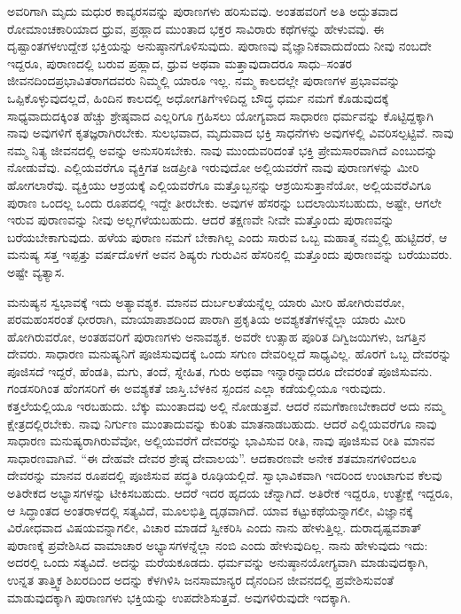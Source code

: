 ಅವರಿಗಾಗಿ ಮೃದು ಮಧುರ ಕಾವ್ಯರಸವನ್ನು ಪುರಾಣಗಳು ಹರಿಸುವವು. ಅಂತಹವರಿಗೆ ಅತಿ ಅದ್ಭುತವಾದ ರೋಮಾಂಚಕಾರಿಯಾದ ಧ್ರುವ, ಪ್ರಹ್ಲಾದ ಮುಂತಾದ ಭಕ್ತರ ಸಾವಿರಾರು ಕಥೆಗಳನ್ನು ಹೇಳುವವು. ಈ ದೃಷ್ಟಾಂತಗಳ\break ಉದ್ದೇಶ ಭಕ್ತಿಯನ್ನು ಅನುಷ್ಠಾನಗೊಳಿಸುವುದು. ಪುರಾಣವು ವೈಜ್ಞಾನಿಕ\-ವಾದುದೆಂದು ನೀವು ನಂಬದೇ ಇದ್ದರೂ, ಪುರಾಣದಲ್ಲಿ ಬರುವ ಪ್ರಹ್ಲಾದ, ಧ್ರುವ ಅಥವಾ ಮತ್ತಾವುದಾದರೂ ಸಾಧು–ಸಂತರ ಜೀವನದಿಂದ\break ಪ್ರಭಾವಿತರಾಗದವರು ನಿಮ್ಮಲ್ಲಿ ಯಾರೂ ಇಲ್ಲ. ನಮ್ಮ ಕಾಲದಲ್ಲೇ ಪುರಾಣಗಳ ಪ್ರಭಾವವನ್ನು ಒಪ್ಪಿಕೊಳ್ಳುವುದಲ್ಲದೆ, ಹಿಂದಿನ ಕಾಲದಲ್ಲಿ ಅಧೋಗತಿಗೆ\break ಇಳಿದಿದ್ದ ಬೌದ್ಧ ಧರ್ಮ ನಮಗೆ ಕೊಡುವುದಕ್ಕೆ ಸಾಧ್ಯವಾದುದಕ್ಕಿಂತ ಹೆಚ್ಚು ಶ್ರೇಷ್ಠವಾದ ಎಲ್ಲರಿಗೂ ಗ್ರಹಿಸಲು ಯೋಗ್ಯವಾದ ಸಾಧಾರಣ ಧರ್ಮವನ್ನು ಕೊಟ್ಟಿದ್ದಕ್ಕಾಗಿ ನಾವು ಅವುಗಳಿಗೆ ಕೃತಜ್ಞರಾಗಿರಬೇಕು. ಸುಲಭವಾದ, ಮೃದುವಾದ ಭಕ್ತಿ ಸಾಧನೆಗಳು ಅವುಗಳಲ್ಲಿ ವಿವರಿಸಲ್ಪಟ್ಟಿವೆ. ನಾವು ನಮ್ಮ ನಿತ್ಯ ಜೀವನದಲ್ಲಿ ಅವನ್ನು ಅನುಸರಿಸಬೇಕು. ನಾವು ಮುಂದುವರಿದಂತೆ ಭಕ್ತಿ ಪ್ರೇಮಸಾರವಾಗಿದೆ ಎಂಬುದನ್ನು ನೋಡುವೆವು. ಎಲ್ಲಿಯವರೆಗೂ ವ್ಯಕ್ತಿಗತ ಜಡಪ್ರೀತಿ ಇರುವುದೋ ಅಲ್ಲಿಯವರೆಗೆ ನಾವು ಪುರಾಣಗಳನ್ನು ಮೀರಿ ಹೋಗಲಾರೆವು. ವ್ಯಕ್ತಿಯು ಆಶ್ರಯಕ್ಕೆ ಎಲ್ಲಿಯವರೆಗೂ ಮತ್ತೊಬ್ಬನನ್ನು ಆಶ್ರಯಿಸುತ್ತಾನೆಯೋ, ಅಲ್ಲಿಯವರೆವಿಗೂ ಪುರಾಣ ಒಂದಲ್ಲ ಒಂದು ರೂಪದಲ್ಲಿ ಇದ್ದೇ ತೀರಬೇಕು. ಅವುಗಳ ಹೆಸರನ್ನು ಬದಲಾಯಿಸಬಹುದು, ಅಷ್ಟೇ, ಆಗಲೇ ಇರುವ ಪುರಾಣವನ್ನು ನೀವು ಅಲ್ಲಗಳೆಯಬಹುದು. ಆದರೆ ತಕ್ಷಣವೇ ನೀವೇ ಮತ್ತೊಂದು ಪುರಾಣವನ್ನು ಬರೆಯಬೇಕಾಗುವುದು. ಹಳೆಯ ಪುರಾಣ ನಮಗೆ ಬೇಕಾಗಿಲ್ಲ ಎಂದು ಸಾರುವ ಒಬ್ಬ ಮಹಾತ್ಮ ನಮ್ಮಲ್ಲಿ ಹುಟ್ಟಿದರೆ, ಆ ಮನುಷ್ಯ ಸತ್ತ ಇಪ್ಪತ್ತು ವರ್ಷದೊಳಗೆ ಅವನ ಶಿಷ್ಯರು ಗುರುವಿನ ಹೆಸರಿನಲ್ಲಿ ಮತ್ತೊಂದು ಪುರಾಣವನ್ನು ಬರೆಯುವರು. ಅಷ್ಟೇ ವ್ಯತ್ಯಾಸ.

ಮನುಷ್ಯನ ಸ್ವಭಾವಕ್ಕೆ ಇದು ಅತ್ಯಾವಶ್ಯಕ. ಮಾನವ ದುರ್ಬಲತೆಯನ್ನೆಲ್ಲ ಯಾರು ಮೀರಿ ಹೋಗಿರುವರೋ, ಪರಮಹಂಸರಂತೆ ಧೀರರಾಗಿ, ಮಾಯಾಪಾಶದಿಂದ ಪಾರಾಗಿ ಪ್ರಕೃತಿಯ ಅವಶ್ಯಕತೆಗಳನ್ನೆಲ್ಲಾ ಯಾರು ಮೀರಿ ಹೋಗಿರುವರೋ, ಅಂತಹವರಿಗೆ ಪುರಾಣಗಳು ಅನಾವಶ್ಯಕ. ಅವರೇ ಉತ್ಸಾಹ ಪೂರಿತ ದಿಗ್ವಿಜಯಿಗಳು, ಜಗತ್ತಿನ ದೇವರು. ಸಾಧಾರಣ ಮನುಷ್ಯನಿಗೆ ಪೂಜಿಸುವುದಕ್ಕೆ ಒಂದು ಸಗುಣ ದೇವರಿಲ್ಲದೆ ಸಾಧ್ಯವಿಲ್ಲ. ಹೊರಗೆ ಒಬ್ಬ ದೇವರನ್ನು ಪೂಜಿಸದೆ ಇದ್ದರೆ, ಹೆಂಡತಿ, ಮಗು, ತಂದೆ, ಸ್ನೇಹಿತ, ಗುರು ಅಥವಾ ಇನ್ನಾರನ್ನಾದರೂ ದೇವರಂತೆ ಪೂಜಿಸುವನು. ಗಂಡಸರಿಗಿಂತ ಹೆಂಗಸರಿಗೆ ಈ ಅವಶ್ಯಕತೆ ಜಾಸ್ತಿ.\break ಬೆಳಕಿನ ಸ್ಪಂದನ ಎಲ್ಲಾ ಕಡೆಯಲ್ಲಿಯೂ ಇರುವುದು. ಕತ್ತಲೆಯಲ್ಲಿಯೂ ಇರಬಹುದು. ಬೆಕ್ಕು ಮುಂತಾದವು ಅಲ್ಲಿ ನೋಡುತ್ತವೆ. ಆದರೆ ನಮಗೆ\break ಕಾಣಬೇಕಾದರೆ ಅದು ನಮ್ಮ ಕ್ಷೇತ್ರದಲ್ಲಿರಬೇಕು. ನಾವು ನಿರ್ಗುಣ ಮುಂತಾದುವನ್ನು ಕುರಿತು ಮಾತನಾಡಬಹುದು. ಆದರೆ ಎಲ್ಲಿಯವರೆಗೂ ನಾವು ಸಾಧಾರಣ ಮನುಷ್ಯರಾಗಿರುವೆವೋ, ಅಲ್ಲಿಯವರೆಗೆ ದೇವರನ್ನು ಭಾವಿಸುವ ರೀತಿ, ನಾವು ಪೂಜಿಸುವ ರೀತಿ ಮಾನವ ಸಾಧಾರಣವಾಗಿವೆ. “ಈ ದೇಹವೇ ದೇವರ ಶ್ರೇಷ್ಠ ದೇವಾಲಯ”. ಆದಕಾರಣವೇ ಅನೇಕ ಶತಮಾನಗಳಿಂದಲೂ ದೇವರನ್ನು ಮಾನವ ರೂಪದಲ್ಲಿ ಪೂಜಿಸುವ ಪದ್ಧತಿ ರೂಢಿಯಲ್ಲಿದೆ. ಸ್ವಾಭಾವಿಕವಾಗಿ ಇದರಿಂದ ಉಂಟಾಗುವ ಕೆಲವು ಅತಿರೇಕದ ಅಭ್ಯಾಸಗಳನ್ನು ಟೀಕಿಸಬಹುದು. ಆದರೆ ಇದರ ಹೃದಯ ಚೆನ್ನಾಗಿದೆ. ಅತಿರೇಕ ಇದ್ದರೂ, ಉತ್ಪ್ರೇಕ್ಷೆ ಇದ್ದರೂ, ಆ ಸಿದ್ಧಾಂತದ ಅಂತರಾಳದಲ್ಲಿ ಸತ್ಯವಿದೆ, ಮೂಲಭಿತ್ತಿ ದೃಢವಾಗಿದೆ. ಯಾವ ಕಟ್ಟುಕಥೆಯನ್ನಾಗಲೀ, ವಿಜ್ಞಾನಕ್ಕೆ ವಿರೋಧವಾದ ವಿಷಯವನ್ನಾಗಲೀ, ವಿಚಾರ ಮಾಡದೆ ಸ್ವೀಕರಿಸಿ ಎಂದು ನಾನು ಹೇಳುತ್ತಿಲ್ಲ. ದುರಾದೃಷ್ಟವಶಾತ್​ ಪುರಾಣಕ್ಕೆ ಪ್ರವೇಶಿಸಿದ ವಾಮಾಚಾರ ಅಭ್ಯಾಸಗಳನ್ನೆಲ್ಲಾ ನಂಬಿ ಎಂದು ಹೇಳುವುದಿಲ್ಲ. ನಾನು ಹೇಳುವುದು ಇದು: ಅದರಲ್ಲಿ ಒಂದು ಸತ್ಯವಿದೆ. ಅದನ್ನು ಮರೆಯಕೂಡದು. ಧರ್ಮವನ್ನು ಅನುಷ್ಠಾನಯೋಗ್ಯವಾಗಿ ಮಾಡುವುದಕ್ಕಾಗಿ, ಉನ್ನತ ತಾತ್ತ್ವಿಕ ಶಿಖರದಿಂದ ಅದನ್ನು ಕೆಳಗಿಳಿಸಿ ಜನಸಾಮಾನ್ಯರ ದೈನಂದಿನ ಜೀವನದಲ್ಲಿ ಪ್ರವೇಶಿಸುವಂತೆ ಮಾಡುವುದಕ್ಕಾಗಿ ಪುರಾಣಗಳು ಭಕ್ತಿಯನ್ನು ಉಪದೇಶಿಸುತ್ತವೆ. ಅವುಗಳಿರುವುದೇ ಇದಕ್ಕಾಗಿ.

